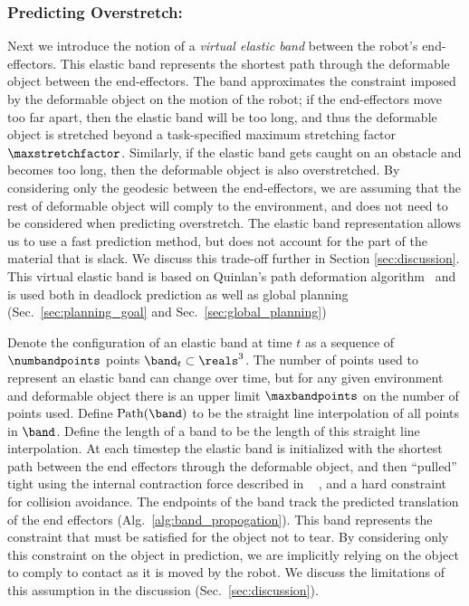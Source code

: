 \subsubsection{Predicting Overstretch:}
\label{sec:overstretch}


Next we introduce the notion of a \textit{virtual elastic band} between the robot's end-effectors. This elastic band represents the shortest path through the deformable object between the end-effectors. The band approximates the constraint imposed by the deformable object on the motion of the robot; if the end-effectors move too far apart, then the elastic band will be too long, and thus the deformable object is stretched beyond a task-specified maximum stretching factor $\maxstretchfactor$. Similarly, if the elastic band gets caught on an obstacle and becomes too long, then the deformable object is also overstretched. By considering only the geodesic between the end-effectors, we are assuming that the rest of deformable object will comply to the environment, and does not need to be considered when predicting overstretch. The elastic band representation allows us to use a fast prediction method, but does not account for the part of the material that is slack. We discuss this trade-off further in Section \ref{sec:discussion}. This virtual elastic band is based on Quinlan's path deformation algorithm~\cite{Quinlan1994} and is used both in deadlock prediction as well as global planning (Sec.~\ref{sec:planning_goal} and Sec.~\ref{sec:global_planning})


Denote the configuration of an elastic band at time $t$ as a sequence of $\numbandpoints$ points $\band_t \subset \reals^3$. The number of points used to represent an elastic band can change over time, but for any given environment and deformable object there is an upper limit $\maxbandpoints$ on the number of points used. Define $\textrm{Path}(\band)$ to be the straight line interpolation of all points in $\band$. Define the length of a band to be the length of this straight line interpolation. At each timestep the elastic band is initialized with the shortest path between the end effectors through the deformable object, and then ``pulled'' tight using the internal contraction force described in ~\cite{Quinlan1994} , and a hard constraint for collision avoidance. The endpoints of the band track the predicted translation of the end effectors (Alg.~\ref{alg:band_propogation}). This band represents the constraint that must be satisfied for the object not to tear. By considering only this constraint on the object in prediction, we are implicitly relying on the object to comply to contact as it is moved by the robot. We discuss the limitations of this assumption in the discussion (Sec.~\ref{sec:discussion}).



